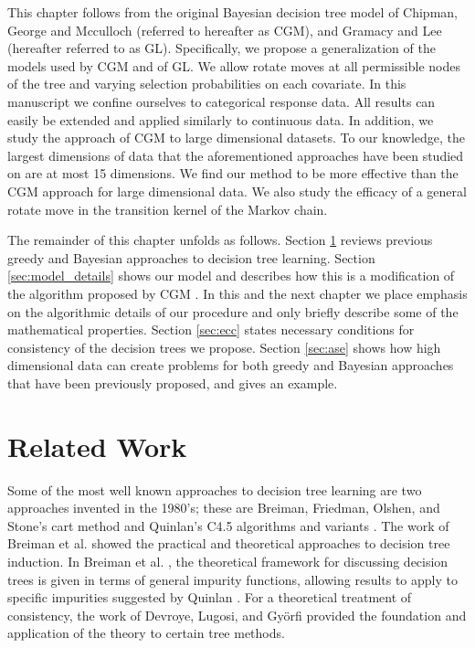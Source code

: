 This chapter follows from the original Bayesian decision tree model of Chipman, George and Mcculloch \cite{chipman1998bayesian} (referred to hereafter as CGM), and Gramacy and Lee \cite{gramacy2008bayesian}(hereafter referred to as GL). Specifically, we propose a generalization of the models used by CGM and of GL. We allow rotate moves at all permissible nodes of the tree and varying selection probabilities on each covariate. In this manuscript we confine ourselves to categorical response data. All results can easily be extended and applied similarly to continuous data. In addition, we study the approach of CGM to large dimensional datasets. To our knowledge, the largest dimensions of data that the aforementioned approaches have been studied on are at most 15 dimensions. We find our method to be more effective than the CGM approach for large dimensional data. We also study the efficacy of a general rotate move in the transition kernel of the Markov chain.

The remainder of this chapter unfolds as follows. Section \ref{sec:related_work} reviews previous greedy and Bayesian approaches to decision tree learning. Section \ref{sec:model_details} shows our model and describes how this is a modification of the algorithm proposed by CGM \cite{chipman1998bayesian}. In this and the next chapter we place emphasis on the algorithmic details of our procedure and only briefly describe some of the mathematical properties. Section \ref{sec:ecc} states necessary conditions for consistency of the decision trees we propose. Section \ref{sec:ase} shows how high dimensional data can create problems for both greedy and Bayesian approaches that have been previously proposed, and gives an example. %

\section{Related Work}\label{sec:related_work}
Some of the most well known approaches to decision tree learning are two approaches invented in the 1980's; these are Breiman, Friedman, Olshen, and Stone's cart method \cite{breiman1984classification} and Quinlan's C4.5 algorithms and variants \cite{quinlan1993c4}.  
The work of Breiman et al. \cite{breiman1984classification} showed the practical and theoretical approaches to decision tree induction. In Breiman et al. \cite{breiman1984classification}, the theoretical framework for discussing decision trees is given in terms of general impurity functions, allowing results to apply to specific impurities suggested by Quinlan \cite{quinlan1993c4}. For a theoretical treatment of consistency, the work of Devroye, Lugosi, and Gy\"{o}rfi \cite{devroye1996probabilistic} provided the foundation and application of the theory to certain tree methods.

